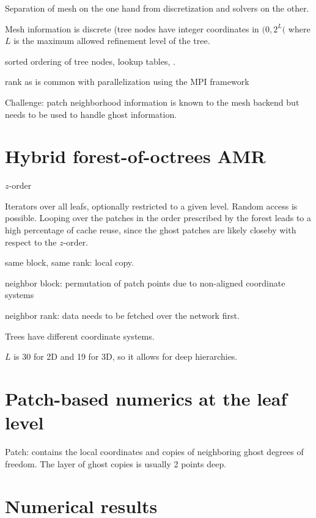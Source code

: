 \documentclass{IOS-Book-Article}     %
\begin{document}
Separation of mesh on the one hand from discretization and solvers on the other.

Mesh information is discrete (tree nodes have integer coordinates in
$(0, 2^L($ where $L$ is the maximum allowed refinement level of the tree.

sorted ordering of tree nodes, lookup tables, .



rank as is common with parallelization using the MPI framework

Challenge: patch neighborhood information is known to the mesh backend
but needs to be used to handle ghost information.



\section*{Hybrid forest-of-octrees AMR}


$z$-order

Iterators over all leafs, optionally restricted to a given level.
Random access is possible.  Looping over the patches in the order prescribed
by the forest leads to a high percentage of cache reuse, since the ghost
patches are likely closeby with respect to the $z$-order.


same block, same rank: local copy.

neighbor block: permutation of patch points due to non-aligned
coordinate systems

neighbor rank: data needs to be fetched over the network first.

Trees have different coordinate systems.

$L$ is 30 for 2D and 19 for 3D, so it allows for deep hierarchies.



\section*{Patch-based numerics at the leaf level}


Patch: contains the local coordinates and copies of neighboring ghost degrees
of freedom.  The layer of ghost copies is usually 2 points deep.


\section*{Numerical results}






\end{document}
